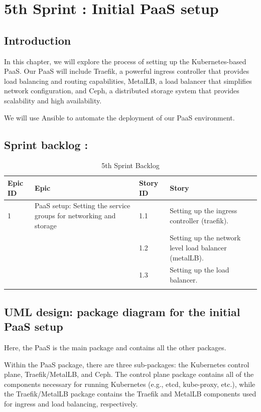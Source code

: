 \graphicspath{{./assets/}}
\setcounter{mtc}{7}
\chapter{5th Sprint : Initial PaaS setup}

\minitoc
\newpage
\section*{Introduction}
In this chapter, we will explore the process of setting up the Kubernetes-based PaaS. Our PaaS will include Traefik, a powerful ingress controller that provides load balancing and routing capabilities, MetalLB, a load balancer that simplifies network configuration, and Ceph, a distributed storage system that provides scalability and high availability.

We will use Ansible to automate the deployment of our PaaS environment.

\section{Sprint backlog :}

\begin{longtable}[H]{|m{1.5cm}|m{3cm}|m{1.5cm}|m{9cm}|}
\hline
{\textbf{Epic ID}} & {\textbf{Epic}} & {\textbf{Story ID}} & {\textbf{Story}}\\
\hline
1  & PaaS setup: Setting the service groups for networking and storage	 &  1.1	 &  Setting up the ingress controller (traefik).\\
\cline{3-4}
& & 1.2 & Setting up the network level load balancer (metalLB). \\
\cline{3-4}
& & 1.3	& Setting up the load balancer. \\
\cline{3-4}
\hline
\caption{5th Sprint Backlog}
\end{longtable}


\section{UML design: package diagram for the initial PaaS setup}

Here, the PaaS is the main package and contains all the other packages.

Within the PaaS package, there are three sub-packages: the Kubernetes control plane, Traefik/MetalLB, and Ceph. The control plane package contains all of the components necessary for running Kubernetes (e.g., etcd, kube-proxy, etc.), while the Traefik/MetalLB package contains the Traefik and MetalLB components used for ingress and load balancing, respectively.

